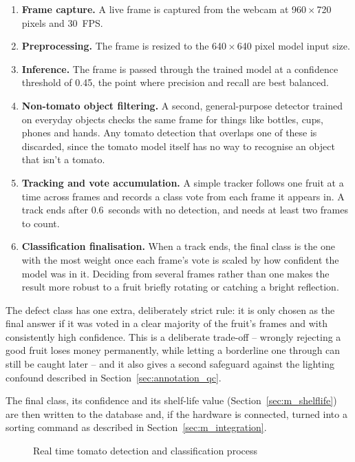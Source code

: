 \begin{enumerate}
    \item \textbf{Frame capture.} A live frame is captured from the webcam at 960\,$\times$\,720 pixels and 30~\acrshort{FPS}.
    \item \textbf{Preprocessing.} The frame is resized to the 640\,$\times$\,640 pixel model input size.
    \item \textbf{Inference.} The frame is passed through the trained model at a confidence threshold of 0.45, the point where precision and recall are best balanced.
    \item \textbf{Non-tomato object filtering.} A second, general-purpose detector trained on everyday objects \citep{lin2014} checks the same frame for things like bottles, cups, phones and hands. Any tomato detection that overlaps one of these is discarded, since the tomato model itself has no way to recognise an object that isn't a tomato.
    \item \textbf{Tracking and vote accumulation.} A simple tracker follows one fruit at a time across frames and records a class vote from each frame it appears in. A track ends after 0.6~seconds with no detection, and needs at least two frames to count.
    \item \textbf{Classification finalisation.} When a track ends, the final class is the one with the most weight once each frame's vote is scaled by how confident the model was in it. Deciding from several frames rather than one makes the result more robust to a fruit briefly rotating or catching a bright reflection.
\end{enumerate}

The defect class has one extra, deliberately strict rule: it is only chosen as the final answer if it was voted in a clear majority of the fruit's frames and with consistently high confidence. This is a deliberate trade-off -- wrongly rejecting a good fruit loses money permanently, while letting a borderline one through can still be caught later -- and it also gives a second safeguard against the lighting confound described in Section~\ref{sec:annotation_qc}.

The final class, its confidence and its shelf-life value (Section~\ref{sec:m_shelflife}) are then written to the database and, if the hardware is connected, turned into a sorting command as described in Section~\ref{sec:m_integration}.

\begin{figure}[H]
\centering
{}
\caption{Real time tomato detection and classification process}
\label{fig:detection}
\end{figure}

